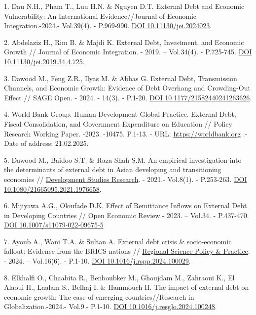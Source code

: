 \begin{references}
1. Dau N.H., Pham T., Luu H.N. \& Nguyen D.T. External Debt and Economic
Vulnerability: An International Evidence//Journal of Economic
Integration.-2024.- Vol.39(4). - P.969-990.
\href{https://doi.org/10.11130/jei.2024023}{DOI 10.11130/jei.2024023}.

2. Abdelaziz H., Rim B. \& Majdi K. External Debt, Investment, and
Economic Growth // Journal of Economic Integration. - 2019. --
Vol.34(4). - P.725-745.
\href{https://doi.org/10.11130/jei.2019.34.4.725}{DOI
10.11130/jei.2019.34.4.725}.

3. Dawood M., Feng Z.R., Ilyas M. \& Abbas G. External Debt,
Transmission Channels, and Economic Growth: Evidence of Debt Overhang
and Crowding-Out Effect // SAGE Open. - 2024. - 14(3). - P.1-20.
\href{https://doi.org/10.1177/21582440241263626}{DOI
10.1177/21582440241263626}.

4. World Bank Group. Human Development Global Practice. External Debt,
Fiscal Consolidation, and Government Expenditure on Education // Policy
Research Working Paper. -2023. -10475. P.1-13. - URL:
\href{https://documents1.worldbank.org/curated/en/099748506072325934/pdf/IDU09d7e7fa50fbff046e00a8a80e07ac5341e5b.pdf}{https://worldbank.org} .-
Date of address: 21.02.2025.

5. Dawood M., Baidoo S.T. \& Raza Shah S.M. An empirical investigation
into the determinants of external debt in Asian developing and
transitioning economies //
\href{https://www.tandfonline.com/journals/rdsr20}{Development Studies
Research}. - 2021.- Vol.8(1). - P.253-263.
\href{https://doi.org/10.1080/21665095.2021.1976658}{DOI
10.1080/21665095.2021.1976658}.

6. Mijiyawa A.G., Oloufade D.K. Effect of Remittance Inflows on External
Debt in Developing Countries // Open Economic Review.- 2023. -- Vol.34.
- P.437-470. \href{https://doi.org/10.1007/s11079-022-09675-5}{DOI
10.1007/s11079-022-09675-5}

7. Ayoub A., Wani T.A. \& Sultan A. External debt crisis \&
socio-economic fallout: Evidence from the BRICS nations //
\href{https://www.sciencedirect.com/journal/regional-science-policy-and-practice}{Regional
Science Policy \& Practice}. - 2024. -- Vol.16(6). - P.1-10.
\href{https://doi.org/10.1016/j.rspp.2024.100029}{DOI
10.1016/j.rspp.2024.100029}.

8. Elkhalfi O., Chaabita R., Benboubker M., Ghoujdam M., Zahraoui K., El
Alaoui H., Laalam S., Belhaj I. \& Hammouch H. The impact of external
debt on economic growth: The case of emerging countries//Research in
Globalization.-2024.- Vol.9.- P.1-10.
\href{https://doi.org/10.1016/j.resglo.2024.100248}{DOI
10.1016/j.resglo.2024.100248}.


\end{references}
